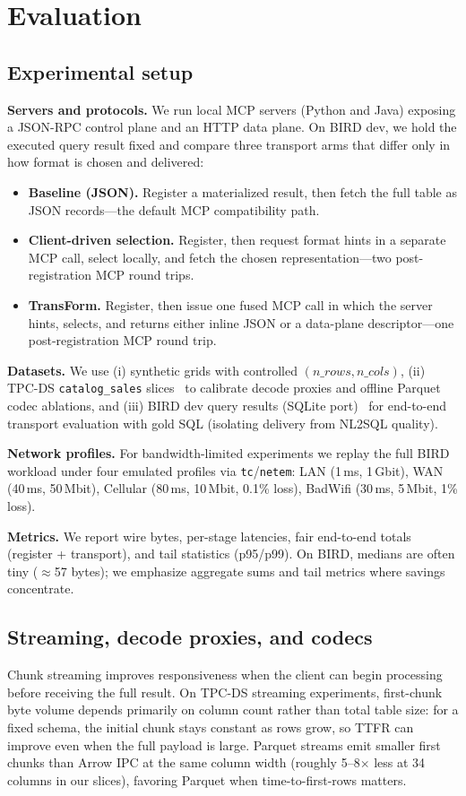 \documentclass[sigconf, nonacm]{acmart}
\begin{document}
\section{Evaluation}
\label{sec:eval}

\subsection{Experimental setup}
\noindent\textbf{Servers and protocols.}
We run local MCP servers (Python and Java) exposing a JSON-RPC control plane and an HTTP data plane. On BIRD dev, we hold the executed query result fixed and compare three transport arms that differ only in how format is chosen and delivered:
\begin{itemize}
  \item \textbf{Baseline (JSON).} Register a materialized result, then fetch the full table as JSON records---the default MCP compatibility path.
  \item \textbf{Client-driven selection.} Register, then request format hints in a separate MCP call, select locally, and fetch the chosen representation---two post-registration MCP round trips.
  \item \textbf{TransForm.} Register, then issue one fused MCP call in which the server hints, selects, and returns either inline JSON or a data-plane descriptor---one post-registration MCP round trip.
\end{itemize}

\noindent\textbf{Datasets.}
We use (i) synthetic grids with controlled $(n\_rows, n\_cols)$, (ii) TPC-DS \texttt{catalog\_sales} slices~\cite{tpcdsSpec} to calibrate decode proxies and offline Parquet codec ablations, and (iii) BIRD dev query results (SQLite port)~\cite{birdSqlNeurips2023} for end-to-end transport evaluation with gold SQL (isolating delivery from NL2SQL quality).

\noindent\textbf{Network profiles.}
For bandwidth-limited experiments we replay the full BIRD workload under four emulated profiles via \texttt{tc}/\texttt{netem}: LAN (1\,ms, 1\,Gbit), WAN (40\,ms, 50\,Mbit), Cellular (80\,ms, 10\,Mbit, 0.1\% loss), BadWifi (30\,ms, 5\,Mbit, 1\% loss).

\noindent\textbf{Metrics.}
We report wire bytes, per-stage latencies, fair end-to-end totals (register + transport), and tail statistics (p95/p99). On BIRD, medians are often tiny ($\approx$57 bytes); we emphasize aggregate sums and tail metrics where savings concentrate.

\subsection{Streaming, decode proxies, and codecs}
Chunk streaming improves responsiveness when the client can begin processing before receiving the full result. On TPC-DS streaming experiments, first-chunk byte volume depends primarily on column count rather than total table size: for a fixed schema, the initial chunk stays constant as rows grow, so TTFR can improve even when the full payload is large. Parquet streams emit smaller first chunks than Arrow IPC at the same column width (roughly 5--8$\times$ less at 34 columns in our slices), favoring Parquet when time-to-first-rows matters.
\end{document}

